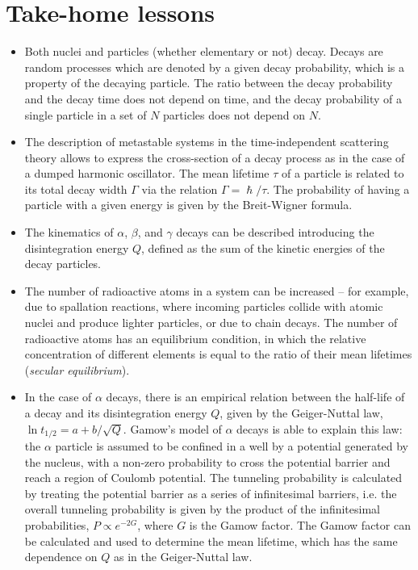\section*{Take-home lessons}
\begin{itemize}
    \item Both nuclei and particles (whether elementary or not) decay. Decays are random processes which are denoted by a given decay probability, which is a property of the decaying particle. The ratio between the decay probability and the decay time does not depend on time, and the decay probability of a single particle in a set of $N$ particles does not depend on $N$.
    \item The description of metastable systems in the time-independent scattering theory allows to express the cross-section of a decay process as in the case of a dumped harmonic oscillator. The mean lifetime $\tau$ of a particle is related to its total decay width $\Gamma$ via the relation $\Gamma = \hslash/\tau$. The probability of having a particle with a given energy is given by the Breit-Wigner formula.
    \item The kinematics of $\alpha$, $\beta$, and $\gamma$ decays can be described introducing the disintegration energy $Q$, defined as the sum of the kinetic energies of the decay particles.
    \item The number of radioactive atoms in a system can be increased -- for example, due to spallation reactions, where incoming particles collide with atomic nuclei and produce lighter particles, or due to chain decays. The number of radioactive atoms has an equilibrium condition, in which the relative concentration of different elements is equal to the ratio of their mean lifetimes (\emph{secular equilibrium}).
    \item In the case of $\alpha$ decays, there is an empirical relation between the half-life of a decay and its disintegration energy $Q$, given by the Geiger-Nuttal law, $\ln t_{1/2}=a+b/\sqrt{Q}$. Gamow's model of $\alpha$ decays is able to explain this law: the $\alpha$ particle is assumed to be confined in a well by a potential generated by the nucleus, with a non-zero probability to cross the potential barrier and reach a region of Coulomb potential. The tunneling probability is calculated by treating the potential barrier as a series of infinitesimal barriers, i.e. the overall tunneling probability is given by the product of the infinitesimal probabilities, $P\propto e^{-2G}$, where $G$ is the Gamow factor. The Gamow factor can be calculated and used to determine the mean lifetime, which has the same dependence on $Q$ as in the Geiger-Nuttal law.

\end{itemize}

